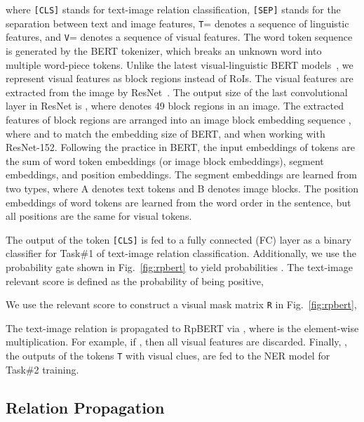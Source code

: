 \documentclass[letterpaper]{article} \usepackage{aaai21}  \usepackage{times}  \usepackage{helvet} \usepackage{courier}  \usepackage[hyphens]{url}  \usepackage{graphicx} \urlstyle{rm} \def\UrlFont{\rm}  \usepackage{natbib}  \usepackage{caption} \frenchspacing  \setlength{\pdfpagewidth}{8.5in}  \setlength{\pdfpageheight}{11in}
\begin{document}
where \texttt{[CLS]} stands for text-image relation classification, \texttt{[SEP]} stands for the separation between text and image features, \texttt{T}= denotes a sequence of linguistic features, and  \texttt{V}= denotes a  sequence of visual features.
The word token sequence is generated by the BERT tokenizer, which breaks an unknown word into multiple word-piece tokens.
Unlike the latest visual-linguistic BERT models~\cite{su2019vl,lu2019vilbert,li2020unicoder}, we represent visual features as block regions instead of RoIs.	
The visual features are extracted from the image by ResNet~\cite{he2016deep}.
The output size of the last convolutional layer in ResNet is , where  denotes 49 block regions in an image. 
The extracted features of block regions  are arranged into an image block embedding sequence , where  and  to match the embedding size of BERT, and  when working with ResNet-152.
Following the practice in BERT, the input embeddings of tokens are the sum of word token embeddings (or image block embeddings), segment embeddings, and position embeddings.
The  segment embeddings are learned from two types, where A denotes text tokens and  B denotes image blocks.
The  position embeddings of word tokens are learned from the word order in the sentence, but all positions are the same for visual tokens.


The output of the token \texttt{[CLS]} is fed to a fully connected (FC) layer as a binary classifier for Task\#1 of text-image relation classification.
Additionally, we use the probability gate  shown in Fig.~\ref{fig:rpbert} to yield probabilities .
The text-image relevant score  is defined as the probability of being positive,
 
We use the relevant score  to construct a visual mask matrix \texttt{R} in Fig.~\ref{fig:rpbert},
 
The text-image relation is propagated to  RpBERT via , where  is the element-wise multiplication.
For example, if , then all visual features are discarded.
Finally,  , the outputs of the tokens \texttt{T} with visual clues, are fed to the NER model  for Task\#2 training.













\subsection{Relation Propagation}
\end{document}
